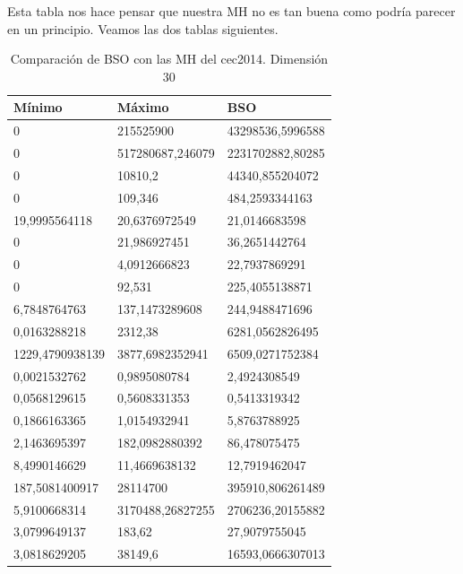 Esta tabla nos hace pensar que nuestra MH no es tan buena como podría parecer en un principio. Veamos las dos tablas siguientes.

\newpage


\begin{table}[htbp]
	\begin{center}
		\begin{tabular}{|l|l|l|}
			\hline
			Mínimo & Máximo & BSO \\
			\hline \hline
			0 & 215525900 & 43298536,5996588 \\ \hline
			0 & 517280687,246079 & 2231702882,80285\\ \hline
			0 & 10810,2 & 44340,855204072\\ \hline
			0 & 109,346 & 484,2593344163\\ \hline
			19,9995564118 & 20,6376972549 & 21,0146683598\\ \hline
			0 & 21,986927451 & 36,2651442764\\ \hline
			0 & 4,0912666823 & 22,7937869291\\ \hline
			0 & 92,531 & 225,4055138871\\ \hline
			6,7848764763 & 137,1473289608 & 244,9488471696\\ \hline
			0,0163288218 & 2312,38 & 6281,0562826495\\ \hline
			1229,4790938139 & 3877,6982352941 & 6509,0271752384\\ \hline
			0,0021532762 & 0,9895080784 & 2,4924308549\\ \hline
			0,0568129615 & 0,5608331353 & 0,5413319342\\ \hline
			0,1866163365 & 1,0154932941 & 5,8763788925\\ \hline
			2,1463695397 & 182,0982880392 & 86,478075475\\ \hline
			8,4990146629 & 11,4669638132 & 12,7919462047\\ \hline
			187,5081400917 & 28114700 & 395910,806261489\\ \hline
			5,9100668314 & 3170488,26827255 & 2706236,20155882\\ \hline
			3,0799649137 & 183,62 & 27,9079755045\\ \hline
			3,0818629205 & 38149,6 & 16593,0666307013\\ \hline
			
		\end{tabular}
		\caption{Comparación de BSO con las MH del cec2014. Dimensión 30}
		\label{tabla:Dimension30Comparativa}
	\end{center}
\end{table}

